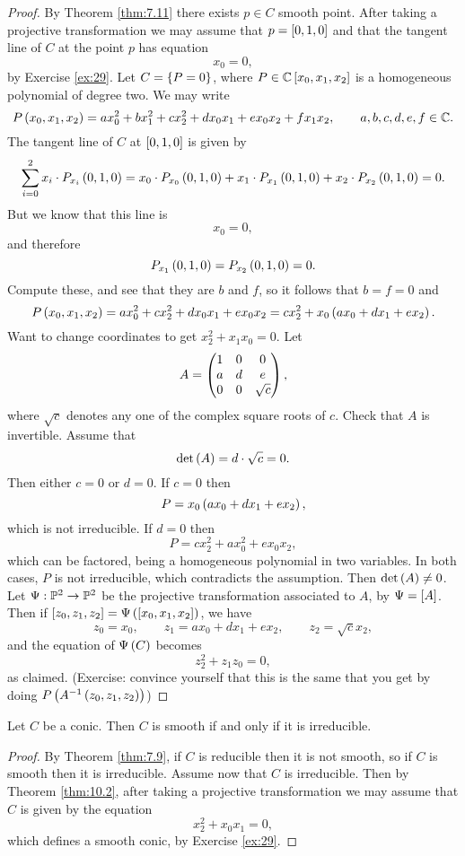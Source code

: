 \begin{proof}
By Theorem \ref{thm:7.11} there exists $ p \in C $ smooth point. After taking a projective transformation we may assume that $ p = \sb{0, 1, 0} $ and that the tangent line of $ C $ at the point $ p $ has equation
$$ x_0 = 0, $$
by Exercise \ref{ex:29}. Let $ C = \cb{P = 0} $, where $ P \in \C\sb{x_0, x_1, x_2} $ is a homogeneous polynomial of degree two. We may write
$$ P\rb{x_0, x_1, x_2} = ax_0^2 + bx_1^2 + cx_2^2 + dx_0x_1 + ex_0x_2 + fx_1x_2, \qquad a, b, c, d, e, f \in \C. $$
The tangent line of $ C $ at $ \sb{0, 1, 0} $ is given by
$$ \sum_{i = 0}^2 x_i \cdot P_{x_i}\rb{0, 1, 0} = x_0 \cdot P_{x_0}\rb{0, 1, 0} + x_1 \cdot P_{x_1}\rb{0, 1, 0} + x_2 \cdot P_{x_2}\rb{0, 1, 0} = 0. $$
But we know that this line is
$$ x_0 = 0, $$
and therefore
$$ P_{x_1}\rb{0, 1, 0} = P_{x_2}\rb{0, 1, 0} = 0. $$
Compute these, and see that they are $ b $ and $ f $, so it follows that $ b = f = 0 $ and
$$ P\rb{x_0, x_1, x_2} = ax_0^2 + cx_2^2 + dx_0x_1 + ex_0x_2 = cx_2^2 + x_0\rb{ax_0 + dx_1 + ex_2}. $$
Want to change coordinates to get $ x_2^2 + x_1x_0 = 0 $. Let
$$ A = \threebythree{1}{0}{0}{a}{d}{e}{0}{0}{\sqrt{c}}, $$
where $ \sqrt{c} $ denotes any one of the complex square roots of $ c $. Check that $ A $ is invertible. Assume that
$$ \det\rb{A} = d \cdot \sqrt{c} = 0. $$
Then either $ c = 0 $ or $ d = 0 $. If $ c = 0 $ then
$$ P = x_0\rb{ax_0 + dx_1 + ex_2}, $$
which is not irreducible. If $ d = 0 $ then
$$ P = cx_2^2 + ax_0^2 + ex_0x_2, $$
which can be factored, being a homogeneous polynomial in two variables. In both cases, $ P $ is not irreducible, which contradicts the assumption. Then $ \det\rb{A} \ne 0 $. Let $ \Psi : \P^2 \to \P^2 $ be the projective transformation associated to $ A $, by $ \Psi = \sb{A} $. Then if $ \sb{z_0, z_1, z_2} = \Psi\rb{\sb{x_0, x_1, x_2}} $, we have
$$ z_0 = x_0, \qquad z_1 = ax_0 + dx_1 + ex_2, \qquad z_2 = \sqrt{c}x_2, $$
and the equation of $ \Psi\rb{C} $ becomes
$$ z_2^2 + z_1z_0 = 0, $$
as claimed. (Exercise: convince yourself that this is the same that you get by doing $ P\rb{A^{-1}\rb{z_0, z_1, z_2}} $)
\end{proof}

\begin{corollary}
\label{cor:10.4}
Let $ C $ be a conic. Then $ C $ is smooth if and only if it is irreducible.
\end{corollary}

\begin{proof}
By Theorem \ref{thm:7.9}, if $ C $ is reducible then it is not smooth, so if $ C $ is smooth then it is irreducible. Assume now that $ C $ is irreducible. Then by Theorem \ref{thm:10.2}, after taking a projective transformation we may assume that $ C $ is given by the equation
$$ x_2^2 + x_0x_1 = 0, $$
which defines a smooth conic, by Exercise \ref{ex:29}.
\end{proof}

